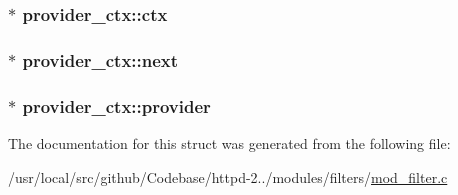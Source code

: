 \subsubsection[{\texorpdfstring{ctx}{ctx}}]{$\ast$ provider\+\_\+ctx\+::ctx}\hypertarget{structprovider__ctx_a50271ced3bbcf8bd2e40b6415bcd520c}{}\label{structprovider__ctx_a50271ced3bbcf8bd2e40b6415bcd520c}
\subsubsection[{\texorpdfstring{next}{next}}]{$\ast$ provider\+\_\+ctx\+::next}\hypertarget{structprovider__ctx_ad1fcbc3f189ce6508e2d7995f65cef10}{}\label{structprovider__ctx_ad1fcbc3f189ce6508e2d7995f65cef10}
\subsubsection[{\texorpdfstring{provider}{provider}}]{$\ast$ provider\+\_\+ctx\+::provider}\hypertarget{structprovider__ctx_a91044cbe8974bf1c82c7ca236c067193}{}\label{structprovider__ctx_a91044cbe8974bf1c82c7ca236c067193}


The documentation for this struct was generated from the following file\+:\begin{DoxyCompactItemize}
\item 
/usr/local/src/github/\+Codebase/httpd-\/2../modules/filters/\hyperlink{mod__filter_8c}{mod\+\_\+filter.\+c}\end{DoxyCompactItemize}
